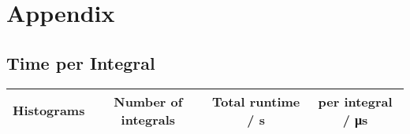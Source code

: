 

\renewcommand\thechapter{A}
\chapter{Appendix}

\section*{Time per Integral}
\begin{table}
	\centering
	\begin{tabular}{ S S S S }
		\toprule
		{Histograms} & {Number of integrals} & {Total runtime / \si{\second}} & {per integral / \si{\micro\second}} \\
		\midrule
		

\end{tabular}
\end{table}
